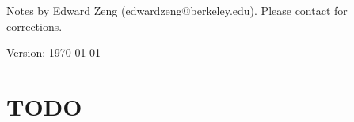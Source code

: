\def\topic{The Fundamental Group}



    \begin{center}
        \color{blue}
        \textsf{Notes by Edward Zeng (edwardzeng@berkeley.edu). Please contact for corrections.}

        \color{red}
        \textsf{Version: \today}
    \end{center}

    \section{TODO}


